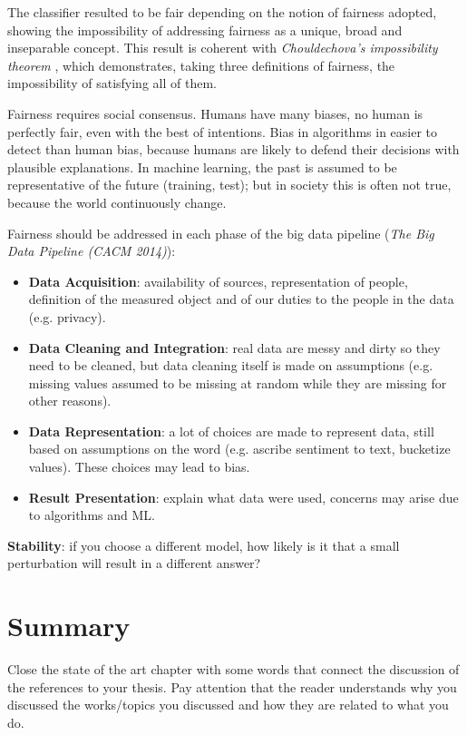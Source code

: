 The classifier resulted to be fair depending on the notion of fairness adopted, showing the impossibility of addressing fairness as a unique, broad and inseparable concept. This result is coherent with \textit{Chouldechova's impossibility theorem} \cite{chouldechova2017fair}, which demonstrates, taking three definitions of fairness, the impossibility of satisfying all of them.


\iffalse

Fairness requires social consensus.
Humans have many biases, no human is perfectly fair, even with the best of intentions.
Bias in algorithms in easier to detect than human bias, because humans are likely to defend their decisions with plausible explanations.
In machine learning, the past is assumed to be representative of the future (training, test); but in society this is often not true, because the world continuously change.

Fairness should be addressed in each phase of the big data pipeline (\textit{The Big Data Pipeline (CACM 2014)}):
\begin{itemize}
\item \textbf{Data Acquisition}: availability of sources, representation of people, definition of the measured object and of our duties to the people in the data (e.g. privacy).
\item \textbf{Data Cleaning and Integration}: real data are messy and dirty so they need to be cleaned, but data cleaning itself is made on assumptions (e.g. missing values assumed to be missing at random while they are missing for other reasons).
\item \textbf{Data Representation}: a lot of choices are made to represent data, still based on assumptions on the word (e.g. ascribe sentiment to text, bucketize values). These choices may lead to bias.
\item \textbf{Result Presentation}: explain what data were used, concerns may arise due to algorithms and ML.
\end{itemize}

\textbf{Stability}: if you choose a different model, how likely is it that a small perturbation will result in a different answer?


\section{Summary}
Close the state of the art chapter with some words that connect the discussion of the references to your thesis. Pay attention that the reader understands why you discussed the works/topics you discussed and how they are related to what you do.

